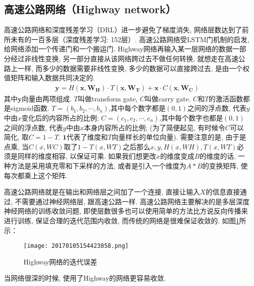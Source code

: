 \subsection{高速公路网络（Highway network）}
高速公路网络和深度残差学习（DRL）进一步避免了梯度消失, 网络层数达到了前所未有的一百多层（深度残差学习: 152层）\cite{HeCVPR2016-9590, NIPS2015-5850}.
高速公路网络受LSTM门机制的启发, 给网络添加一个传递门和一个搬运门. Highway网络再输入某一层网络的数据一部分经过非线性变换, 另一部分直接从该网络跨过去不做任何转换, 就想走在高速公路上一样, 而多少的数据需要非线性变换, 多少的数据可以直接跨过去, 是由一个权值矩阵和输入数据共同决定的.
\begin{align}
\mathbf{y}=H\left(\mathbf{x}, \mathbf{W}_{\mathbf{H}}\right) \cdot T\left(\mathbf{x}, \mathbf{W}_{\mathbf{T}}\right)+\mathbf{x} \cdot C\left(\mathbf{x}, \mathbf{W}_{\mathbf{C}}\right)
\end{align}
其中$\bm y$向量由两项组成. $T$叫做transform gate, $C$叫做carry gate. $C$和$T$的激活函数都是sigmoid函数.
$T=(b_1, b_2, \cdots, b_n)$,其中每个数字都是$(0, 1)$之间的浮点数, 代表$y$中由$x$变化后的内容所占的比例;
$C=(c_1, c_2, \cdots, c_n)$,其中每个数字也都是$(0, 1)$之间的浮点数, 代表$y$中由$x$本身内容所占的比例;
(为了简便起见, 有时候令$C$可以简化, 取$C=1-T$. $\bm 1$代表了维度和$T$向量样长的单位向量).
需要注意的是, 由于是点乘, 当$C(x,WC)$取了$1-T(x,WT)$之后那么$x,y,H(x,WH),T(x,WT)$必须是同样的维度相容, 以保证可乘.
如果我们想更改$x$的维度变成$B$的维度的话, 一种方法是采用填充零和下采样的方法, 或者是引入一个维度为$A*B$的变换矩阵, 使每次都乘上这个矩阵.

高速公路网络就是在输出和网络层之间加了一个连接, 直接让输入$X$的信息直接通过, 不需要通过神经网络层, 跟高速公路一样.
高速公路网络主要解决的是多层深度神经网络的训练收敛问题, 即使层数很多也可以使用简单的方法比方说反向传播来进行训练, 保证合理的迭代范围内收敛, 而传统的网络是很难保证收敛的. 如图\ref{20170105154423858}所示：
\begin{figure}[H]
\centering
\texttt{[image: 20170105154423858.png]}
\caption{Highway网络的迭代误差}
\label{20170105154423858}
\end{figure}
当网络很深的时候, 使用了Highway的网络更容易收敛.
